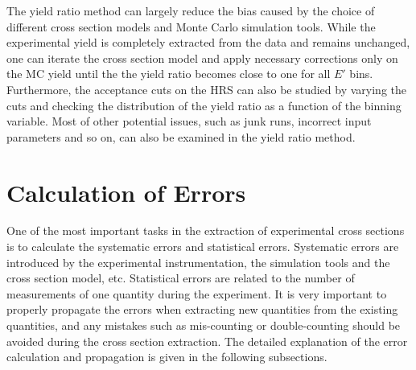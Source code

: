 The yield ratio method can largely reduce the bias caused by the choice of different cross section models and Monte Carlo simulation tools. While the experimental yield is completely extracted from the data and remains unchanged, one can iterate the cross section model and apply necessary corrections only on the MC yield until the the yield ratio becomes close to one for all $E'$ bins. Furthermore, the acceptance cuts on the HRS can also be studied by varying the cuts and checking the distribution of the yield ratio as a function of the binning variable. Most of other potential issues, such as junk runs, incorrect input parameters and so on, can also be examined in the yield ratio method.


\section{Calculation of Errors}
 One of the most important tasks in the extraction of experimental cross sections is to calculate the systematic errors and statistical errors. Systematic errors are introduced by the experimental instrumentation, the simulation tools and the cross section model, etc. Statistical errors are related to the number of measurements of one quantity during the experiment. It is very important to properly propagate the errors when extracting new quantities from the existing quantities, and any mistakes such as mis-counting or double-counting should be avoided during the cross section extraction. The detailed explanation of the error calculation and propagation is given in the following subsections.

